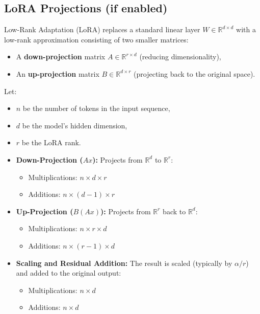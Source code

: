 \documentclass[a4paper,12pt]{article}
\begin{document}
\subsection*{LoRA Projections (if enabled)}

Low-Rank Adaptation (LoRA) replaces a standard linear layer $W \in \mathbb{R}^{d \times d}$ with a low-rank approximation consisting of two smaller matrices:
\begin{itemize}
  \item A \textbf{down-projection} matrix $A \in \mathbb{R}^{r \times d}$ (reducing dimensionality),
  \item An \textbf{up-projection} matrix $B \in \mathbb{R}^{d \times r}$ (projecting back to the original space).
\end{itemize}

Let:
\begin{itemize}
  \item $n$ be the number of tokens in the input sequence,
  \item $d$ be the model's hidden dimension,
  \item $r$ be the LoRA rank.
\end{itemize}

\begin{itemize}
  \item \textbf{Down-Projection ($A x$):} Projects from $\mathbb{R}^{d}$ to $\mathbb{R}^{r}$:
  \begin{itemize}
    \item Multiplications: $n \times d \times r$
    \item Additions: $n \times (d - 1) \times r$
  \end{itemize}

  \item \textbf{Up-Projection ($B (A x)$):} Projects from $\mathbb{R}^{r}$ back to $\mathbb{R}^{d}$:
  \begin{itemize}
    \item Multiplications: $n \times r \times d$
    \item Additions: $n \times (r - 1) \times d$
  \end{itemize}

  \item \textbf{Scaling and Residual Addition:} The result is scaled (typically by $\alpha / r$) and added to the original output:
  \begin{itemize}
    \item Multiplications: $n \times d$
    \item Additions: $n \times d$
  \end{itemize}
\end{itemize}
\end{document}
